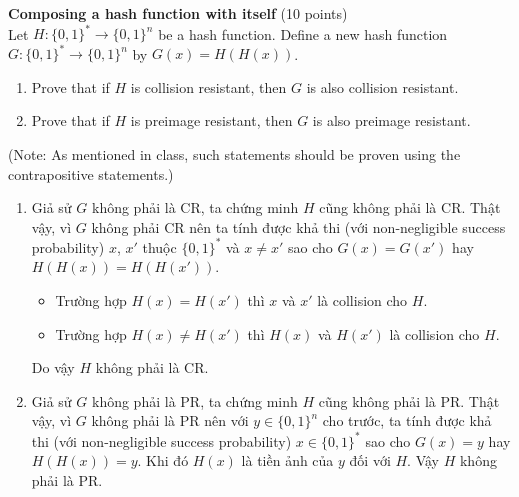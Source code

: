 \begin{problem}{\bf Composing a hash function with itself} (10 points)\\
Let $H: \{0,1\}^* \rightarrow \{0,1\}^n$ be a hash function. Define a new
hash function $G : \{0,1\}^* \rightarrow \{0,1\}^n$ by $G(x) = H(H(x))$.
\begin{enumerate}[label=(\alph*)]
\item Prove that if $H$ is collision resistant, then $G$ is also collision
resistant.
\item Prove that if $H$ is preimage resistant, then $G$ is also preimage
resistant.
\end{enumerate}
(Note: As mentioned in class, such statements should be proven using the
contrapositive statements.)
\end{problem}

\begin{loigiai}
  \begin{enumerate}[label=(\alph*)]
    \item Giả sử $G$ không phải là CR, ta chứng minh $H$ cũng không phải là CR. Thật vậy, vì $G$ không phải CR nên ta
      tính được khả thi (với non-negligible success probability) $x$, $x'$ thuộc $\{0, 1\}^\ast$ và $x\ne x'$ sao cho
      $G(x) = G(x')$ hay $H(H(x)) = H(H(x'))$.
      \begin{itemize}
        \item Trường hợp $H(x) = H(x')$ thì $x$ và $x'$ là collision cho $H$.
        \item Trường hợp $H(x) \ne H(x')$ thì $H(x)$ và $H(x')$ là collision cho $H$.
      \end{itemize} Do vậy $H$ không phải là CR.
    \item Giả sử $G$ không phải là PR, ta chứng minh $H$ cũng không phải là PR. Thật vậy, vì $G$ không phải là PR nên
      với $y \in \{0, 1\}^n$ cho trước, ta tính được khả thi (với non-negligible success probability) $x \in \{0,
      1\}^\ast$ sao cho $G(x) = y$ hay $H(H(x)) = y$. Khi đó $H(x)$ là tiền ảnh của $y$ đối với $H$. Vậy $H$ không phải
      là PR.
  \end{enumerate}
\end{loigiai}
